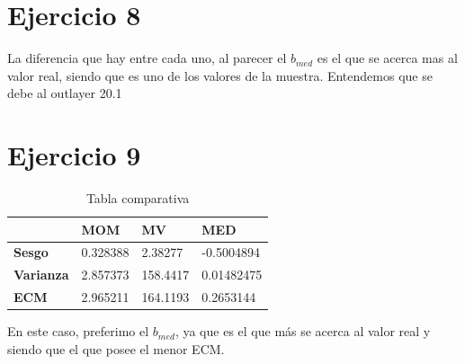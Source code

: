 \documentclass{article}
\begin{document}
\section{Ejercicio 8}
La diferencia que hay entre cada uno, al parecer el $b_{med}$ es el que se acerca mas al valor real, siendo que es uno de los valores de la muestra. Entendemos que se debe al outlayer 20.1

\newpage

\section{Ejercicio 9}
\newline

\begin{table}[h!]
\centering
\caption{Tabla comparativa}
\label{my-label}
\begin{tabular}{llll}
\hline
\multicolumn{1}{|l|}{}                  & \multicolumn{1}{l|}{\textbf{MOM}} & \multicolumn{1}{l|}{\textbf{MV}} & \multicolumn{1}{l|}{\textbf{MED}} \\ \hline
\multicolumn{1}{|l|}{\textbf{Sesgo}}    & \multicolumn{1}{l|}{0.328388}   & \multicolumn{1}{l|}{2.38277}   & \multicolumn{1}{l|}{-0.5004894}    \\ \hline
\multicolumn{1}{|l|}{\textbf{Varianza}} & \multicolumn{1}{l|}{2.857373}     & \multicolumn{1}{l|}{158.4417}    & \multicolumn{1}{l|}{0.01482475}   \\ \hline
\multicolumn{1}{|l|}{\textbf{ECM}}      & \multicolumn{1}{l|}{2.965211}     & \multicolumn{1}{l|}{164.1193}    & \multicolumn{1}{l|}{0.2653144}    \\ \hline

\end{tabular}
\end{table}

En este caso, preferimo el $b_{med}$, ya que es el que más se acerca al valor real y siendo que el que posee el menor ECM.
\end{document}
